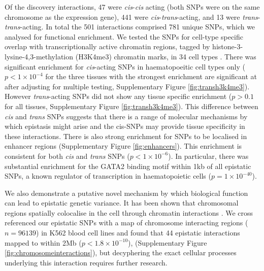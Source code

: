 \documentclass{article}
\begin{document}
Of the discovery interactions, 47 were \emph{cis}-\emph{cis} acting (both SNPs were on the same chromosome as the expression gene), 441 were \emph{cis}-\emph{trans}-acting, and 13 were \emph{trans}-\emph{trans}-acting. In total the 501 interactions comprised 781 unique SNPs, which we analysed for functional enrichment. We tested the SNPs for cell-type specific overlap with transcriptionally active chromatin regions, tagged by histone-3-lysine-4,3-methylation (H3K4me3) chromatin marks, in 34 cell types \cite{Trynka2013}. There was significant enrichment for \emph{cis}-acting SNPs in haematopoeitic cell types only ($p < 1 \times 10^{-4}$ for the three tissues with the strongest enrichment are significant at after adjusting for multiple testing, Supplementary Figure \ref{fig:transh3k4me3}). However \emph{trans}-acting SNPs did not show any tissue specific enrichment ($p > 0.1$ for all tissues, Supplementary Figure \ref{fig:transh3k4me3}). 
This difference between \emph{cis} and \emph{trans} SNPs suggests that there is a range of molecular mechanisms by which epistasis might arise and the cis-SNPs may provide tissue specificity in these interactions. There is also strong enrichment for SNPs to be localised in enhancer regions \cite{Ward2012a} (Supplementary Figure \ref{fig:enhancers}). This enrichment is consistent for both \emph{cis} and \emph{trans} SNPs ($p < 1 \times 10^{-6}$). In particular, there was substantial enrichment for the GATA2 binding motif within 1kb of all epistatic SNPs, a known regulator of transcription in haematopoietic cells \cite{Tsai1994} ($p = 1 \times 10^{-40}$).

We also demonstrate a putative novel mechanism by which biological function can lead to epistatic genetic variance. It has been shown that chromosomal regions spatially colocalise in the cell through chromatin interactions \cite{Lieberman-Aiden2009}. We cross referenced our epistatic SNPs with a map of chromosome interacting regions ($n = 96139$) in K562 blood cell lines \cite{Lan2012} and found that 44 epistatic interactions mapped to within 2Mb ($p < 1.8 \times 10^{-10}$), (Supplementary Figure \ref{fig:chromosomeinteractions}), but decyphering the exact cellular processes underlying this interaction requires further research.
\end{document}
